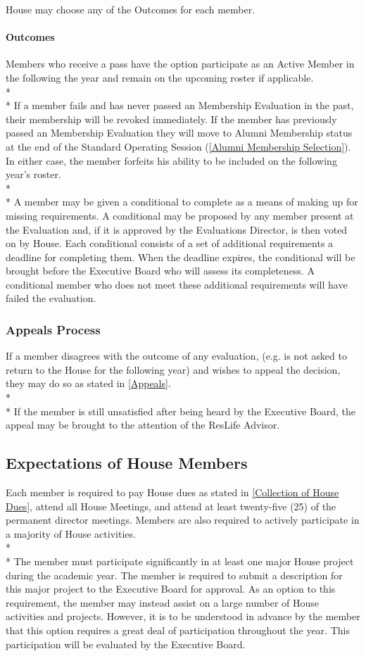 \documentclass{article}
\newcommand{\bsection}[1]{\subsection{#1} \label{#1}}
\newcommand{\bsubsection}[1]{\subsubsection{#1} \label{#1}}
\newcommand{\bsubsubsection}[1]{\paragraph{#1} \label{#1}}
\begin{document}
House may choose any of the Outcomes for each member.
\bsubsubsection{Outcomes}
Members who receive a pass have the option participate as an Active Member in the following the year and remain on the upcoming roster if applicable.
\\* \\*
If a member fails and has never passed an Membership Evaluation in the past, their membership will be revoked immediately.
If the member has previously passed an Membership Evaluation they will move to Alumni Membership status at the end of the Standard Operating Session (\ref{Alumni Membership Selection}).
In either case, the member forfeits his ability to be included on the following year’s roster.
\\* \\*
A member may be given a conditional to complete as a means of making up for missing requirements.
A conditional may be proposed by any member present at the Evaluation and, if it is approved by the Evaluations Director, is then voted on by House.
Each conditional consists of a set of additional requirements a deadline for completing them.
When the deadline expires, the conditional will be brought before the Executive Board who will assess its completeness.
A conditional member who does not meet these additional requirements will have failed the evaluation.
\bsubsection{Appeals Process}
If a member disagrees with the outcome of any evaluation, (e.g. is not asked to return to the House for the following year) and wishes to appeal the decision, they may do so as stated in \ref{Appeals}.
\\* \\*
If the member is still unsatisfied after being heard by the Executive Board, the appeal may be brought to the attention of the ResLife Advisor.

\bsection{Expectations of House Members}
Each member is required to pay House dues as stated in \ref{Collection of House Dues}, attend all House Meetings, and attend at least twenty-five (25) of the permanent director meetings.
Members are also required to actively participate in a majority of House activities.
\\* \\*
The member must participate significantly in at least one major House project during the academic year.
The member is required to submit a description for this major project to the Executive Board for approval.
As an option to this requirement, the member may instead assist on a large number of House activities and projects.
However, it is to be understood in advance by the member that this option requires a great deal of participation throughout the year.
This participation will be evaluated by the Executive Board.
\end{document}
